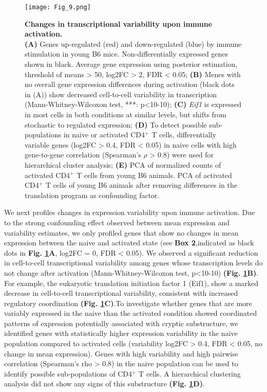 \begin{figure}[!ht]
\centering
\texttt{[image: Fig\_9.png]}
\caption[Changes in transcriptional variability upon immune activation]{\textbf{Changes in transcriptional variability upon immune activation.}\\
\textbf{(A)} Genes up-regulated (red) and down-regulated (blue) by immune stimulation in young B6 mice. Non-differentially expressed genes shown in black. Average gene expression using posterior estimation, threshold of means > 50, log2FC > 2, FDR < 0.05; \textbf{(B)} Menes with no overall gene expression differences during activation (black dots in (A)) show decreased cell-to-cell variability in transcription (Mann-Whitney-Wilcoxon test, ***: p<10-10); \textbf{(C)} \textit{Eif1} is expressed in most cells in both conditions at similar levels, but shifts from stochastic to regulated expression; \textbf{(D)} To detect possible sub-populations in naive or activated CD4$^+$ T cells, differentially variable genes (log2FC > 0.4, FDR < 0.05) in naive cells with high gene-to-gene correlation (Spearman’s $\rho$ > 0.8) were used for hierarchical cluster analysis; \textbf{(E)} PCA of normalized counts of activated CD4$^+$ T cells from young B6 animals. PCA of activated CD4$^+$ T cells of young B6 animals after removing differences in the translation program as confounding factor.
}
\label{fig1:immune_variability}
\end{figure}

We next profiles changes in expression variability upon immune activation. Due to the strong confounding effect observed between mean expression and variability estimates, we only profiled genes that show no changes in mean expression between the naive and activated state (see \textbf{Box 2},indicated as black dots in \textbf{Fig. \ref{fig1:immune_variability}A}, log2FC = 0, FDR < 0.05). We observed a significant reduction in cell-to-cell transcriptional variability among genes whose transcription levels do not change after activation (Mann-Whitney-Wilcoxon test, p<10-10) \textbf{(Fig. \ref{fig1:immune_variability}B)}. For example, the eukaryotic translation initiation factor 1 (Eif1), show a marked decrease in cell-to-cell transcriptional variability, consistent with increased regulatory coordination \textbf{(Fig. \ref{fig1:immune_variability}C)}.To investigate whether genes that are more variably expressed in the naive than the activated condition showed coordinated patterns of expression potentially associated with cryptic substructure, we identified genes with statistically higher expression variability in the naive population compared to activated cells (variability log2FC > 0.4, FDR < 0.05, no change in mean expression). Genes with high variability and high pairwise correlation (Spearman’s rho > 0.8) in the naive population can be used to identify possible sub-populations of CD4$^+$ T cells. A hierarchical clustering analysis did not show any signs of this substructure \textbf{(Fig. \ref{fig1:immune_variability}D)}. 

